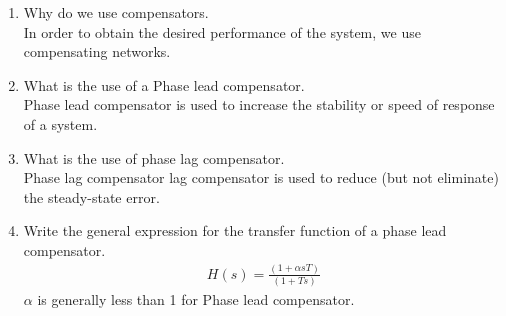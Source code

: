 \begin{enumerate}[label=\thesection.\arabic*.,ref=\thesection.\theenumi]

\item Why do we use compensators. \\
\solution In order to obtain the desired performance of the system, we use compensating networks.

\item What is the use of a Phase lead compensator. \\
\solution Phase lead compensator is used to increase the stability or speed of response of a system.

\item What is the use of phase lag compensator. \\
\solution Phase lag compensator lag compensator is used to reduce (but not eliminate) the steady-state error.

\item Write the general expression for the transfer function of a phase lead compensator. \\
\solution 
\begin{align}
    H(s) = \frac{(1+ \alpha s T)}{(1+T s)}
\end{align}
$\alpha$ is generally less than 1 for Phase lead compensator.


\end{enumerate}
